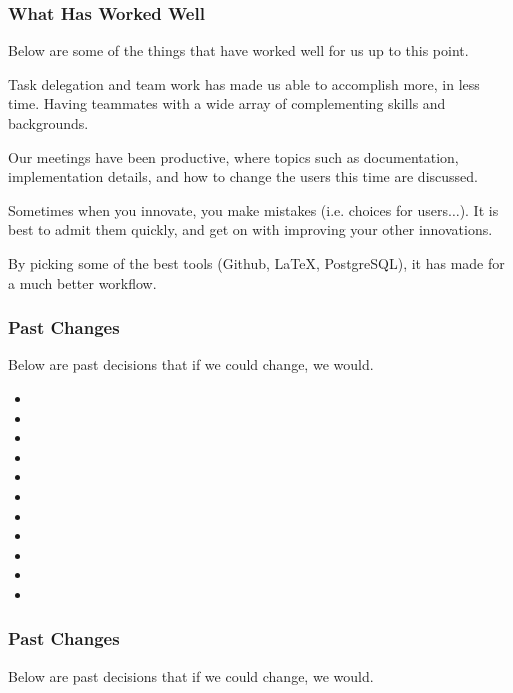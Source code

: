 \documentclass{beamer}
\newcounter{tools}
\begin{document}
\begin{frame}
    \frametitle{What Has Worked Well}
    Below are some of the things that have worked well for us up to this point.

    \begin{description}[<+->]
        \item[Teamwork] Task delegation and team work has made us able to accomplish more, in less time. Having teammates with a wide array of complementing skills and backgrounds.
        \item[Meetings] Our meetings have been productive, where topics such as documentation, implementation details, and how to change the users this time are discussed.
        \item[Changes] Sometimes when you innovate, you make mistakes (i.e. choices for users$\ldots$). It is best to admit them quickly, and get on with improving your other innovations. %
        \item[Tools] By picking some of the best tools (Github, \LaTeX{}, PostgreSQL), it has made for a much better workflow.
    \end{description}
\end{frame}


\begin{frame}
    \frametitle{Past Changes}
    Below are past decisions that if we could change, we would. \pause

    \begin{itemize}
        \item
        \item
        \item
        \item
        \item
        \item
        \item
        \item
        \item
        \item
        \item
    \end{itemize}
\end{frame}

\begin{frame}
    \frametitle{Past Changes}
    Below are past decisions that if we could change, we would.

    \centering
\end{frame}
\end{document}
